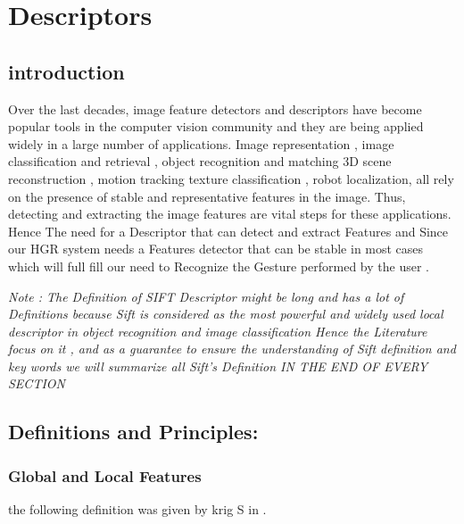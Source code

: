 
\chapter{Descriptors}\label{descriptors}

\section{introduction}

Over the last decades, image feature detectors and descriptors have become popular tools in the computer vision community and they are being applied widely in a large number of applications. Image representation , image classification and retrieval  , object recognition and matching  3D scene reconstruction , motion tracking   texture classification , robot localization, all rely on the presence of stable and representative features in the image. Thus, detecting and extracting the image features are vital steps for these applications.
Hence The need for a Descriptor that can detect and extract Features 
and Since our HGR system needs a Features detector that can be stable in most cases which will  full fill our need to Recognize the Gesture performed by the user .


\textit{Note : The Definition of SIFT  Descriptor might be long and has a lot of Definitions because Sift is considered as the most  powerful and widely used local descriptor in object recognition and image classification Hence the Literature focus on it  , and as a guarantee  to ensure the understanding of  Sift definition and key words  we will summarize all Sift's  Definition  IN THE END OF EVERY SECTION }

\section{Definitions and Principles:}

\subsection{Global and Local Features}
the following definition was given by krig S in \cite{krig}. 

